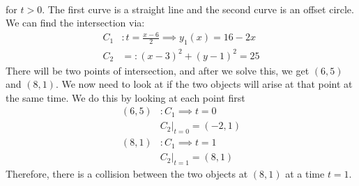 \begin{itemize}
\begin{example}
\begin{align}
        \end{align}
        for $t>0$. The first curve is a straight line and the second curve is an offset circle. We can find the intersection via:
        \begin{align}
            C_1 &: t = \frac{x-6}{2} \implies y_1(x) = 16-2x \\ 
            C_2 &=: (x-3)^2 + (y-1)^2 = 25
        \end{align}
        There will be two points of intersection, and after we solve this, we get $(6,5)$ and $(8,1)$. We now need to look at if the two objects will arise at that point at the same time. We do this by looking at each point first
        \begin{align}
            (6,5) &: C_1 \implies t = 0 \\ 
            & C_2|_{t=0} = (-2,1) \\ 
            (8,1) &: C_1 \implies t = 1 \\
            & C_2|_{t=1} = (8,1)
        \end{align}
        Therefore, there is a collision between the two objects at $(8,1)$ at a time $t=1$.
    \end{example}
\end{itemize}